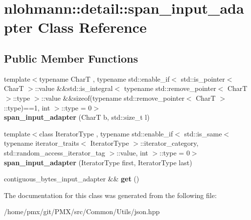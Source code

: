\hypertarget{classnlohmann_1_1detail_1_1span__input__adapter}{}\section{nlohmann\+:\+:detail\+:\+:span\+\_\+input\+\_\+adapter Class Reference}
\label{classnlohmann_1_1detail_1_1span__input__adapter}
\subsection*{Public Member Functions}
\begin{DoxyCompactItemize}
\item 
\mbox{\label{classnlohmann_1_1detail_1_1span__input__adapter_a3a328a45b2c2c87145106ce4b2d02365}} 
{\footnotesize template$<$typename CharT , typename std\+::enable\+\_\+if$<$ std\+::is\+\_\+pointer$<$ Char\+T $>$\+::value \&\&std\+::is\+\_\+integral$<$ typename std\+::remove\+\_\+pointer$<$ Char\+T $>$\+::type $>$\+::value \&\&sizeof(typename std\+::remove\+\_\+pointer$<$ Char\+T $>$\+::type)==1, int $>$\+::type  = 0$>$ }\\{\bfseries span\+\_\+input\+\_\+adapter} (CharT b, std\+::size\+\_\+t l)
\item 
\mbox{\label{classnlohmann_1_1detail_1_1span__input__adapter_a714c6cf8e15b9af4e1723d9f7f92d4c8}} 
{\footnotesize template$<$class Iterator\+Type , typename std\+::enable\+\_\+if$<$ std\+::is\+\_\+same$<$ typename iterator\+\_\+traits$<$ Iterator\+Type $>$\+::iterator\+\_\+category, std\+::random\+\_\+access\+\_\+iterator\+\_\+tag $>$\+::value, int $>$\+::type  = 0$>$ }\\{\bfseries span\+\_\+input\+\_\+adapter} (Iterator\+Type first, Iterator\+Type last)
\item 
\mbox{\label{classnlohmann_1_1detail_1_1span__input__adapter_a478dfb78d0bf28d2665a19fccf221f02}} 
contiguous\+\_\+bytes\+\_\+input\+\_\+adapter \&\& {\bfseries get} ()
\end{DoxyCompactItemize}


The documentation for this class was generated from the following file\+:\begin{DoxyCompactItemize}
\item 
/home/pmx/git/\+P\+M\+X/src/\+Common/\+Utils/json.\+hpp\end{DoxyCompactItemize}
